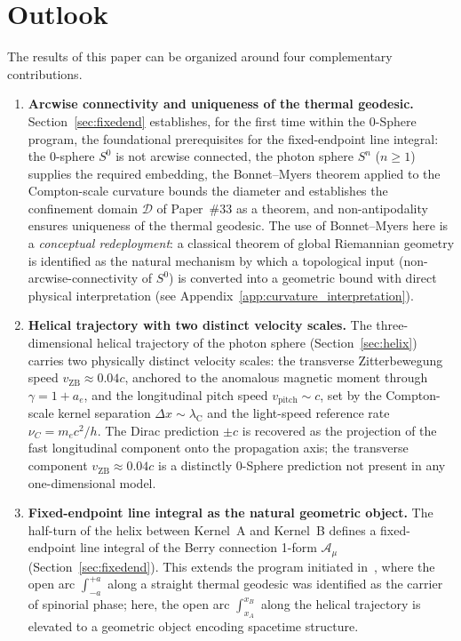 \documentclass[%
 reprint, amsmath,amssymb, aps, prb, ]{revtex4-2}
\numberwithin{equation}{section}
\newcommand{\lambdaC}{\lambda_{\mathrm{C}}}
\begin{document}
\section{Outlook}
\label{sec:outlook}

The results of this paper can be organized around four complementary contributions.

\begin{enumerate}

\item \textbf{Arcwise connectivity and uniqueness of the thermal geodesic.} Section~\ref{sec:fixedend} establishes, for the first time within the 0-Sphere program, the foundational prerequisites for the fixed-endpoint line integral: the 0-sphere $S^0$ is not arcwise connected, the photon sphere $S^n$ ($n\geq 1$) supplies the required embedding, the Bonnet--Myers theorem applied to the Compton-scale curvature bounds the diameter and establishes the confinement domain $\mathcal{D}$ of Paper~\#33 as a theorem, and non-antipodality ensures uniqueness of the thermal geodesic. The use of Bonnet--Myers here is a \emph{conceptual redeployment}: a classical theorem of global Riemannian geometry is identified as the natural mechanism by which a topological input (non-arcwise-connectivity of $S^0$) is converted into a geometric bound with direct physical interpretation (see Appendix~\ref{app:curvature_interpretation}).

\item \textbf{Helical trajectory with two distinct velocity scales.} The three-dimensional helical trajectory of the photon sphere (Section~\ref{sec:helix}) carries two physically distinct velocity scales: the transverse Zitterbewegung speed $v_{\mathrm{ZB}}\approx 0.04c$, anchored to the anomalous magnetic moment through $\gamma=1+a_e$, and the longitudinal pitch speed $v_{\mathrm{pitch}}\sim c$, set by the Compton-scale kernel separation $\Delta x\sim\lambdaC$ and the light-speed reference rate $\nu_C = m_ec^2/h$. The Dirac prediction $\pm c$ is recovered as the projection of the fast longitudinal component onto the propagation axis; the transverse component $v_{\mathrm{ZB}}\approx 0.04c$ is a distinctly 0-Sphere prediction not present in any one-dimensional model.

\item \textbf{Fixed-endpoint line integral as the natural geometric object.}
The half-turn of the helix between Kernel~A and Kernel~B defines a fixed-endpoint line integral of the Berry connection 1-form $\mathcal{A}_\mu$ (Section~\ref{sec:fixedend}).
This extends the program initiated in~\cite{hanamura29}, where the open arc $\int_{-a}^{+a}$ along a straight thermal geodesic was identified as the carrier of spinorial phase; here, the open arc $\int_{x_A}^{x_B}$ along the helical trajectory is elevated to a geometric object encoding spacetime structure.


\end{enumerate}
\end{document}
